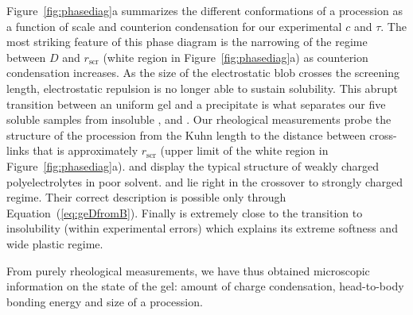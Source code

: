 \documentclass[twoside,twocolumn,9pt]{article}
\begin{document}
Figure~\ref{fig:phasediag}a summarizes the different conformations of a procession as a function of scale and counterion condensation for our experimental $c$ and $\tau$. The most striking feature of this phase diagram is the narrowing of the regime between $D$ and $r_\mathrm{scr}$ (white region in Figure~\ref{fig:phasediag}a) as counterion condensation increases. As the size of the electrostatic blob crosses the screening length, electrostatic repulsion is no longer able to sustain solubility. This abrupt transition between an uniform gel and a precipitate is what separates our five soluble samples from insoluble ,  and . Our rheological measurements probe the structure of the procession from the Kuhn length to the distance between cross-links that is approximately $r_\mathrm{scr}$ (upper limit of the white region in Figure~\ref{fig:phasediag}a).  and  display the typical structure of weakly charged polyelectrolytes in poor solvent.  and  lie right in the crossover to strongly charged regime. Their correct description is possible only through Equation~(\ref{eq:geDfromB}). Finally  is extremely close to the transition to insolubility (within experimental errors) which explains its extreme softness and wide plastic regime.

From purely rheological measurements, we have thus obtained microscopic information on the state of the gel: amount of charge condensation, head-to-body bonding energy and size of a procession.
\end{document}
